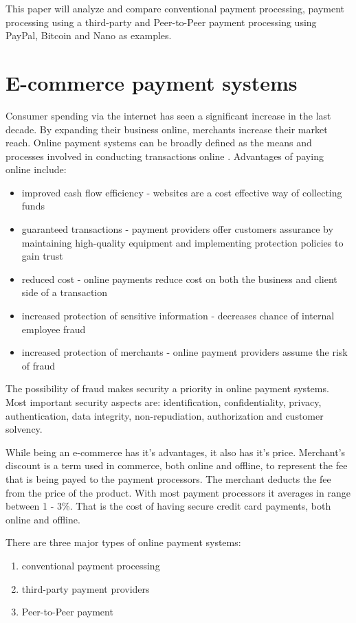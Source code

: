 \documentclass{ferseminar}
\begin{document}
This paper will analyze and compare conventional payment processing, payment processing using a third-party and Peer-to-Peer payment processing using PayPal, Bitcoin and Nano as examples.


\section{E-commerce payment systems}

Consumer spending via the internet has seen a significant increase in the last decade. By expanding their business online, merchants increase their market reach. Online payment systems can be broadly defined as the means and processes involved in conducting transactions online \cite{Lowry}. Advantages of paying online include:
\begin{itemize}
	\item improved cash flow efficiency - websites are a cost effective way of collecting funds
	\item guaranteed transactions - payment providers offer customers assurance by maintaining high-quality equipment and implementing protection policies to gain trust
	\item reduced cost - online payments reduce cost on both the business and client side of a transaction
	\item increased protection of sensitive information - decreases chance of internal employee fraud
	\item increased protection of merchants - online payment providers assume the risk of fraud
\end{itemize}

The possibility of fraud makes security a priority in online payment systems. Most important security aspects are: identification, confidentiality, privacy, authentication, data integrity, non-repudiation, authorization and customer solvency.

While being an e-commerce has it's advantages, it also has it's price. Merchant's discount is a term used in commerce, both online and offline, to represent the fee that is being payed to the payment processors. The merchant deducts the fee from the price of the product. With most payment processors it averages in range between 1 - 3\%. That is the cost of having secure credit card payments, both online and offline. 

There are three major types of online payment systems:
\begin{enumerate}
	\item conventional payment processing
	\item third-party payment providers
	\item Peer-to-Peer payment
\end{enumerate}
\end{document}
